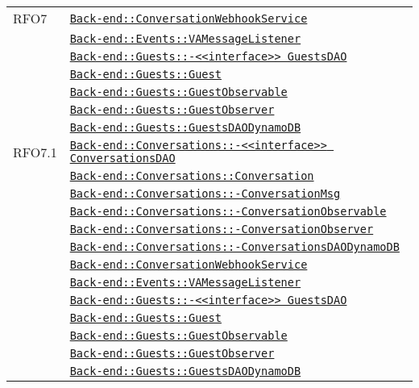 \begin{longtable}{|>{\centering}m{3cm}|m{10cm}<{\centering}|}
RFO7 & \hyperref[Back-end::ConversationWebhookService]{\texttt{Back-end::ConversationWebhookService}}\\
& \hyperref[Back-end::Events::VAMessageListener]{\texttt{Back-end::Events::VAMessageListener}}\\
& \hyperref[Back-end::Guests::<<interface>> GuestsDAO]{\texttt{Back-end::Guests::-\linebreak <<interface>> GuestsDAO}}\\
& \hyperref[Back-end::Guests::Guest]{\texttt{Back-end::Guests::Guest}}\\
& \hyperref[Back-end::Guests::GuestObservable]{\texttt{Back-end::Guests::GuestObservable}}\\
& \hyperref[Back-end::Guests::GuestObserver]{\texttt{Back-end::Guests::GuestObserver}}\\
& \hyperref[Back-end::Guests::GuestsDAODynamoDB]{\texttt{Back-end::Guests::GuestsDAODynamoDB}}\\ \hline

RFO7.1 & \hyperref[Back-end::Conversations::<<interface>> ConversationsDAO]{\texttt{Back-end::Conversations::-\linebreak <<interface>> ConversationsDAO}}\\
& \hyperref[Back-end::Conversations::Conversation]{\texttt{Back-end::Conversations::Conversation}}\\
& \hyperref[Back-end::Conversations::ConversationMsg]{\texttt{Back-end::Conversations::-\linebreak ConversationMsg}}\\
& \hyperref[Back-end::Conversations::ConversationObservable]{\texttt{Back-end::Conversations::-\linebreak ConversationObservable}}\\
& \hyperref[Back-end::Conversations::ConversationObserver]{\texttt{Back-end::Conversations::-\linebreak ConversationObserver}}\\
& \hyperref[Back-end::Conversations::ConversationsDAODynamoDB]{\texttt{Back-end::Conversations::-\linebreak ConversationsDAODynamoDB}}\\
& \hyperref[Back-end::ConversationWebhookService]{\texttt{Back-end::ConversationWebhookService}}\\
& \hyperref[Back-end::Events::VAMessageListener]{\texttt{Back-end::Events::VAMessageListener}}\\
& \hyperref[Back-end::Guests::<<interface>> GuestsDAO]{\texttt{Back-end::Guests::-\linebreak <<interface>> GuestsDAO}}\\
& \hyperref[Back-end::Guests::Guest]{\texttt{Back-end::Guests::Guest}}\\
& \hyperref[Back-end::Guests::GuestObservable]{\texttt{Back-end::Guests::GuestObservable}}\\
& \hyperref[Back-end::Guests::GuestObserver]{\texttt{Back-end::Guests::GuestObserver}}\\
& \hyperref[Back-end::Guests::GuestsDAODynamoDB]{\texttt{Back-end::Guests::GuestsDAODynamoDB}}\\ \hline


\end{longtable}

